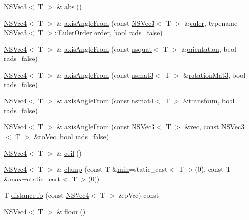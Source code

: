 \begin{DoxyCompactItemize}
\item 
\hyperlink{structNSVec3}{N\-S\-Vec3}$<$ T $>$ \& \hyperlink{structNSVec4_aad2f04859c31e4d697c72660986c7d9a}{abs} ()
\item 
\hyperlink{structNSVec4}{N\-S\-Vec4}$<$ T $>$ \& \hyperlink{structNSVec4_acdc9bb3d0773090a4097e4527a726000}{axis\-Angle\-From} (const \hyperlink{structNSVec3}{N\-S\-Vec3}$<$ T $>$ \&\hyperlink{nsvec3_8h_ac03cece5b2ce21941bb4b4a02ea7e2b6}{euler}, typename \hyperlink{structNSVec3}{N\-S\-Vec3}$<$ T $>$\-::Euler\-Order order, bool rads=false)
\item 
\hyperlink{structNSVec4}{N\-S\-Vec4}$<$ T $>$ \& \hyperlink{structNSVec4_a2cc159660f12e24218d553c2b30f640b}{axis\-Angle\-From} (const \hyperlink{structnsquat}{nsquat}$<$ T $>$ \&\hyperlink{nsquat_8h_af20bc5e18c379261a387ab197e9b971f}{orientation}, bool rads=false)
\item 
\hyperlink{structNSVec4}{N\-S\-Vec4}$<$ T $>$ \& \hyperlink{structNSVec4_adde9a5b4a8ed165b579d9ad26319ca87}{axis\-Angle\-From} (const \hyperlink{structnsmat3}{nsmat3}$<$ T $>$ \&\hyperlink{nsmat3_8h_ad4de391de75c02e722b41b139734200b}{rotation\-Mat3}, bool rads=false)
\item 
\hyperlink{structNSVec4}{N\-S\-Vec4}$<$ T $>$ \& \hyperlink{structNSVec4_aefe2adaa35264916a71e494a7cca88e6}{axis\-Angle\-From} (const \hyperlink{structnsmat4}{nsmat4}$<$ T $>$ \&transform, bool rads=false)
\item 
\hyperlink{structNSVec4}{N\-S\-Vec4}$<$ T $>$ \& \hyperlink{structNSVec4_a16c87879847b03110383ce89d64d0bcb}{axis\-Angle\-From} (const \hyperlink{structNSVec3}{N\-S\-Vec3}$<$ T $>$ \&vec, const \hyperlink{structNSVec3}{N\-S\-Vec3}$<$ T $>$ \&to\-Vec, bool rads=false)
\item 
\hyperlink{structNSVec4}{N\-S\-Vec4}$<$ T $>$ \& \hyperlink{structNSVec4_afd65c5b3019b2c0d405233e672620dc7}{ceil} ()
\item 
\hyperlink{structNSVec4}{N\-S\-Vec4}$<$ T $>$ \& \hyperlink{structNSVec4_a70a29cf32173fd6c9adc787db7957e56}{clamp} (const T \&\hyperlink{structNSVec4_af251086273e4cb16df037b64781013a0}{min}=static\-\_\-cast$<$ T $>$(0), const T \&\hyperlink{structNSVec4_a7b2f3fa616dae2528d7fc345bcb1e311}{max}=static\-\_\-cast$<$ T $>$(0))
\item 
T \hyperlink{structNSVec4_ab5a3e7a969b0dafdb44a3ac824dc095a}{distance\-To} (const \hyperlink{structNSVec4}{N\-S\-Vec4}$<$ T $>$ \&p\-Vec) const 
\item 
\hyperlink{structNSVec4}{N\-S\-Vec4}$<$ T $>$ \& \hyperlink{structNSVec4_afe34dc08d0280ecbf1e17cb5834dbe39}{floor} ()

\end{DoxyCompactItemize}
